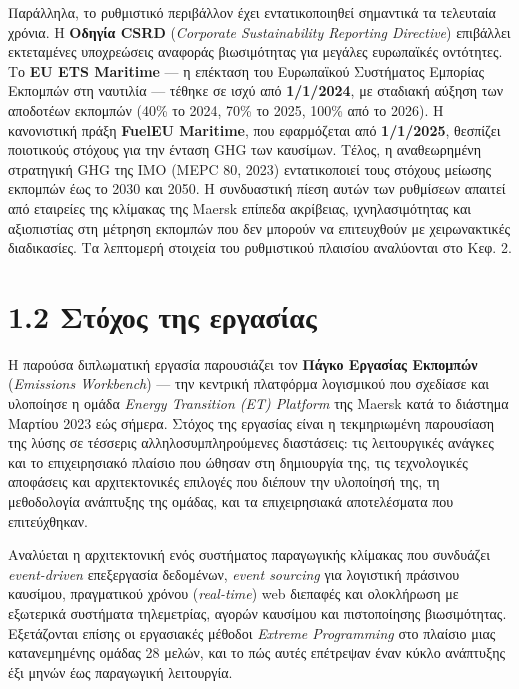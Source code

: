 Παράλληλα, το ρυθμιστικό περιβάλλον έχει εντατικοποιηθεί σημαντικά τα
τελευταία χρόνια. Η \textbf{Οδηγία CSRD} (\emph{Corporate Sustainability
Reporting Directive}) επιβάλλει εκτεταμένες υποχρεώσεις αναφοράς
βιωσιμότητας για μεγάλες ευρωπαϊκές οντότητες. Το \textbf{EU ETS
Maritime} --- η επέκταση του Ευρωπαϊκού Συστήματος Εμπορίας Εκπομπών στη
ναυτιλία --- τέθηκε σε ισχύ από \textbf{1/1/2024}, με σταδιακή αύξηση
των αποδοτέων εκπομπών (40\% το 2024, 70\% το 2025, 100\% από το 2026).
Η κανονιστική πράξη \textbf{FuelEU Maritime}, που εφαρμόζεται από
\textbf{1/1/2025}, θεσπίζει ποιοτικούς στόχους για την ένταση GHG των
καυσίμων. Τέλος, η αναθεωρημένη στρατηγική GHG της IMO (MEPC 80, 2023)
εντατικοποιεί τους στόχους μείωσης εκπομπών έως το 2030 και 2050. Η
συνδυαστική πίεση αυτών των ρυθμίσεων απαιτεί από εταιρείες της κλίμακας
της Maersk επίπεδα ακρίβειας, ιχνηλασιμότητας και αξιοπιστίας στη
μέτρηση εκπομπών που δεν μπορούν να επιτευχθούν με χειρωνακτικές
διαδικασίες. Τα λεπτομερή στοιχεία του ρυθμιστικού πλαισίου αναλύονται
στο Κεφ. 2.

\section{1.2 Στόχος της
εργασίας}\label{ux3c3ux3c4ux3ccux3c7ux3bfux3c2-ux3c4ux3b7ux3c2-ux3b5ux3c1ux3b3ux3b1ux3c3ux3afux3b1ux3c2}

Η παρούσα διπλωματική εργασία παρουσιάζει τον \textbf{Πάγκο Εργασίας
Εκπομπών} (\emph{Emissions Workbench}) --- την κεντρική πλατφόρμα
λογισμικού που σχεδίασε και υλοποίησε η ομάδα \emph{Energy Transition
(ET) Platform} της Maersk κατά το διάστημα Μαρτίου 2023 εώς σήμερα.
Στόχος της εργασίας είναι η τεκμηριωμένη παρουσίαση της λύσης σε
τέσσερις αλληλοσυμπληρούμενες διαστάσεις: τις λειτουργικές ανάγκες και
το επιχειρησιακό πλαίσιο που ώθησαν στη δημιουργία της, τις τεχνολογικές
αποφάσεις και αρχιτεκτονικές επιλογές που διέπουν την υλοποίησή της, τη
μεθοδολογία ανάπτυξης της ομάδας, και τα επιχειρησιακά αποτελέσματα που
επιτεύχθηκαν.

Αναλύεται η αρχιτεκτονική ενός συστήματος παραγωγικής κλίμακας που
συνδυάζει \emph{event-driven} επεξεργασία δεδομένων, \emph{event
sourcing} για λογιστική πράσινου καυσίμου, πραγματικού χρόνου
(\emph{real-time}) web διεπαφές και ολοκλήρωση με εξωτερικά συστήματα
τηλεμετρίας, αγορών καυσίμου και πιστοποίησης βιωσιμότητας. Εξετάζονται
επίσης οι εργασιακές μέθοδοι \emph{Extreme Programming} στο πλαίσιο μιας
κατανεμημένης ομάδας 28 μελών, και το πώς αυτές επέτρεψαν έναν κύκλο
ανάπτυξης έξι μηνών έως παραγωγική λειτουργία.

